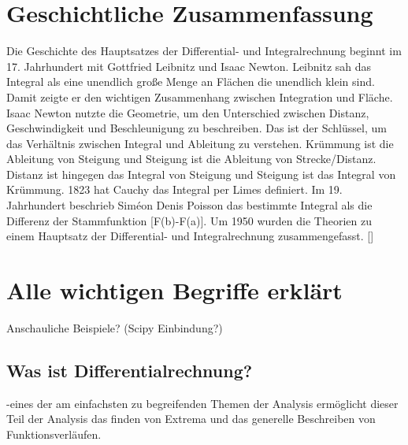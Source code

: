 \documentclass[fontsize=12pt,paper=a4,DIV12,cleardoublepage=empty, 
liststotoc,idxtotoc,bibtotoc]{article}
\theoremstyle{plain}
\theoremstyle{definition}
\begin{document}
	\section{Geschichtliche Zusammenfassung}
	Die Geschichte des Hauptsatzes der Differential- und Integralrechnung beginnt im 17. Jahrhundert mit Gottfried Leibnitz und Isaac Newton. Leibnitz sah das Integral als eine unendlich große Menge an Flächen die unendlich klein sind. Damit zeigte er den wichtigen Zusammenhang zwischen Integration und Fläche. Isaac Newton nutzte die Geometrie, um den Unterschied zwischen Distanz, Geschwindigkeit und Beschleunigung zu beschreiben. Das ist der Schlüssel, um das Verhältnis zwischen Integral und Ableitung zu verstehen. Krümmung ist die Ableitung von Steigung und Steigung ist die Ableitung von Strecke/Distanz. Distanz ist hingegen das Integral von Steigung und Steigung ist das Integral von Krümmung. 1823 hat Cauchy das Integral per Limes definiert. Im 19. Jahrhundert beschrieb Siméon Denis Poisson das bestimmte Integral als die Differenz der Stammfunktion [F(b)-F(a)]. Um 1950 wurden die Theorien zu einem Hauptsatz der Differential- und Integralrechnung zusammengefasst. [\cite[vgl.]{DMB}]
	
	

	\section{Alle wichtigen Begriffe erklärt}
	Anschauliche Beispiele? (Scipy Einbindung?)
	
	
	\subsection{Was ist Differentialrechnung?}
	-eines der am einfachsten zu begreifenden Themen der Analysis ermöglicht dieser Teil der Analysis das finden von Extrema und das generelle Beschreiben von Funktionsverläufen.
	
\end{document}
